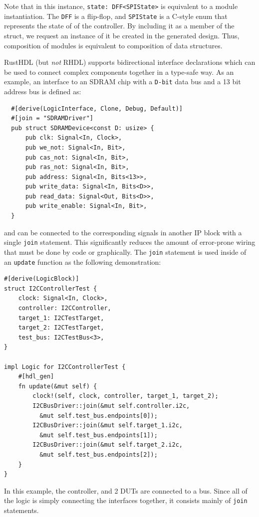 \documentclass[sigplan,screen,sigconf]{acmart}
\begin{document}
Note that in this instance, \verb|state: DFF<SPIState>| is equivalent to a module 
instantiation.  The \verb|DFF| is a flip-flop, and \verb|SPIState| is a C-style enum 
that represents the state of of the controller.  By including it as a member of the 
struct, we request an instance of it be created in the generated design.  Thus, composition of 
modules is equivalent to composition of data structures.

RustHDL (but \emph{not} RHDL) supports bidirectional interface declarations which can 
be used to connect complex components together in a type-safe way.
As an example, an interface to an SDRAM chip with a \verb|D-bit| data bus and a 13 bit 
address bus is defined as:

\begin{verbatim}
  #[derive(LogicInterface, Clone, Debug, Default)]
  #[join = "SDRAMDriver"]
  pub struct SDRAMDevice<const D: usize> {
      pub clk: Signal<In, Clock>,
      pub we_not: Signal<In, Bit>,
      pub cas_not: Signal<In, Bit>,
      pub ras_not: Signal<In, Bit>,
      pub address: Signal<In, Bits<13>>,
      pub write_data: Signal<In, Bits<D>>,
      pub read_data: Signal<Out, Bits<D>>,
      pub write_enable: Signal<In, Bit>,
  }
\end{verbatim}

and can be connected to the corresponding signals in another IP block with a 
single \verb|join| statement.  This significantly reduces the amount of 
error-prone wiring that must be done by code or graphically.  The \verb|join| statement 
is used inside of an \verb|update| function as the following demonstration:

\begin{verbatim}
#[derive(LogicBlock)]
struct I2CControllerTest {
    clock: Signal<In, Clock>,
    controller: I2CController,
    target_1: I2CTestTarget,
    target_2: I2CTestTarget,
    test_bus: I2CTestBus<3>,
}

impl Logic for I2CControllerTest {
    #[hdl_gen]
    fn update(&mut self) {
        clock!(self, clock, controller, target_1, target_2);
        I2CBusDriver::join(&mut self.controller.i2c, 
          &mut self.test_bus.endpoints[0]);
        I2CBusDriver::join(&mut self.target_1.i2c,
          &mut self.test_bus.endpoints[1]);
        I2CBusDriver::join(&mut self.target_2.i2c, 
          &mut self.test_bus.endpoints[2]);
    }
}
\end{verbatim}

In this example, the controller, and 2 DUTs are connected to a bus.  
Since all of the logic is simply connecting the interfaces together, 
it consists mainly of \verb|join| statements. 
\end{document}
